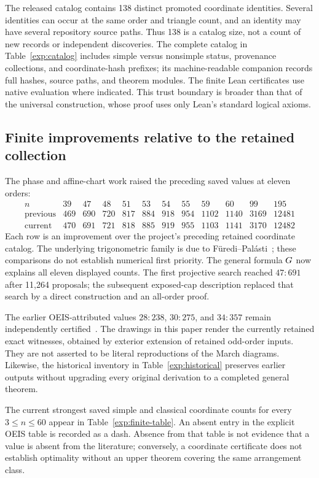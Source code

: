 The released catalog contains 138 distinct promoted coordinate identities.
Several identities can occur at the same order and triangle count, and an
identity may have several repository source paths. Thus 138 is a catalog size,
not a count of new records or independent discoveries. The complete catalog
in Table~\ref{exp:catalog} includes simple versus nonsimple status, provenance
collections, and coordinate-hash prefixes; its machine-readable companion
records full hashes, source paths, and theorem modules. The finite Lean
certificates use native evaluation where indicated. This trust boundary is
broader than that of the universal construction, whose proof uses only Lean's
standard logical axioms.

\subsection{Finite improvements relative to the retained collection}

The phase and affine-chart work raised the preceding saved values at eleven
orders:
\[
\begin{array}{c|rrrrrrrrrrr}
n&39&47&48&51&53&54&55&59&60&99&195\\\hline
\text{previous}&469&690&720&817&884&918&954&1102&1140&3169&12481\\
\text{current}&470&691&721&818&885&919&955&1103&1141&3170&12482
\end{array}
\]
Each row is an improvement over the project's preceding retained coordinate
catalog. The underlying trigonometric family is due to
F\"uredi--Pal\'asti~\cite{furedipalasti1984}; these comparisons do not establish
numerical first priority. The general formula $G$ now explains all eleven
displayed counts. The first projective search reached $47:691$ after 11,264
proposals; the subsequent exposed-cap description replaced that search by a
direct construction and an all-order proof.

The earlier OEIS-attributed values $28:238$, $30:275$, and $34:357$ remain
independently certified~\cite{oeisA006066,zarzuelo2026}. The drawings in this
paper render the currently retained exact witnesses, obtained by exterior
extension of retained odd-order inputs. They are not asserted to be literal
reproductions of the March diagrams. Likewise, the historical inventory in
Table~\ref{exp:historical} preserves earlier outputs without upgrading every
original derivation to a completed general theorem.

The current strongest saved simple and classical coordinate counts for every
$3\leq n\leq60$ appear in Table~\ref{exp:finite-table}. An absent entry in the
explicit OEIS table is recorded as a dash. Absence from that table is not
evidence that a value is absent from the literature; conversely, a coordinate
certificate does not establish optimality without an upper theorem covering
the same arrangement class.


